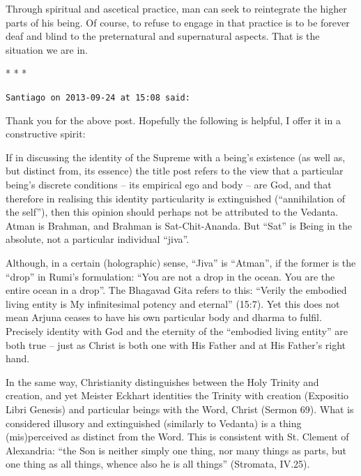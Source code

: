 Through spiritual and ascetical practice, man can seek to reintegrate the higher parts of his being. Of course, to refuse to engage in that practice is to be forever deaf and blind to the preternatural and supernatural aspects. That is the situation we are in.



\begin{center}* * *\end{center}

\begin{footnotesize}
\begin{sffamily}

\texttt{Santiago on 2013-09-24 at 15:08 said:}

Thank you for the above post. Hopefully the following is helpful, I offer it in a constructive spirit:

If in discussing the identity of the Supreme with a being's existence (as well as, but distinct from, its essence) the title post refers to the view that a particular being's discrete conditions -- its empirical ego and body -- are God, and that therefore in realising this identity particularity is extinguished (``annihilation of the self''), then this opinion should perhaps not be attributed to the Vedanta. Atman is Brahman, and Brahman is Sat-Chit-Ananda. But ``Sat'' is Being in the absolute, not a particular individual ``jiva''.

Although, in a certain (holographic) sense, ``Jiva'' is ``Atman'', if the former is the ``drop'' in Rumi's formulation: ``You are not a drop in the ocean. You are the entire ocean in a drop''. The Bhagavad Gita refers to this: ``Verily the embodied living entity is My infinitesimal potency and eternal'' (15:7). Yet this does not mean Arjuna ceases to have his own particular body and dharma to fulfil. Precisely identity with God and the eternity of the ``embodied living entity'' are both true -- just as Christ is both one with His Father and at His Father's right hand.

In the same way, Christianity distinguishes between the Holy Trinity and creation, and yet Meister Eckhart identities the Trinity with creation (Expositio Libri Genesis) and particular beings with the Word, Christ (Sermon 69). What is considered illusory and extinguished (similarly to Vedanta) is a thing (mis)perceived as distinct from the Word. This is consistent with St. Clement of Alexandria: ``the Son is neither simply one thing, nor many things as parts, but one thing as all things, whence also he is all things'' (Stromata, IV.25).


\end{sffamily}
\end{footnotesize}

